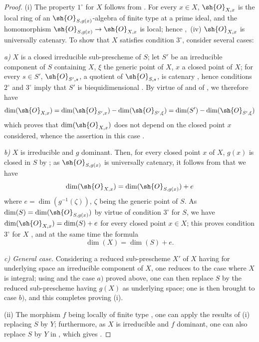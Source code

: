 \begin{proof}
(i) The property $1^\circ$ for $X$ follows from .
For every $x\in X$, $\sh{O}_{X,x}$ is the local ring of an $\sh{O}_{S,g(x)}$-algebra of finite type at a prime ideal, and the homomorphism $\sh{O}_{S,g(x)}\to\sh{O}_{X,x}$ is local; hence ,~(iv) $\sh{O}_{X,x}$ is universally catenary.
To show that $X$ satisfies condition $3^\circ$, consider several cases:

\emph{a)} $X$ is a closed irreducible sub-prescheme of $S$; let $S'$ be an irreducible component of $S$ containing $X$, $\xi$ the generic point of $X$, $x$ a closed point of $X$; for every $s\in S'$, $\sh{O}_{S',s}$, a quotient of $\sh{O}_{S,s}$, is catenary , hence conditions $2^\circ$ and $3^\circ$ imply that $S'$ is biequidimensional .
By virtue of  and of , we therefore have
\[
  \dim(\sh{O}_{X,x})=\dim(\sh{O}_{S',x})-\dim(\sh{O}_{S',\xi})=\dim(S')-\dim(\sh{O}_{S',\xi})
\]
which proves that $\dim(\sh{O}_{X,x})$ does not depend on the closed point $x$ considered, whence the assertion in this case .

\emph{b)} $X$ is irreducible and $g$ dominant.
Then, for every closed point $x$ of $X$, $g(x)$ is closed in $S$ by ; as $\sh{O}_{S,g(x)}$ is universally catenary, it follows from  that we have
\[
  \dim(\sh{O}_{X,x})=\dim(\sh{O}_{S,g(x)})+e
\]
where $e=\dim(g^{-1}(\zeta))$, $\zeta$ being the generic point of $S$.
As $\dim(S)=\dim(\sh{O}_{S,g(x)})$ by virtue of condition $3^\circ$ for $S$, we have $\dim(\sh{O}_{X,x})=\dim(S)+e$ for every closed point $x\in X$; this proves condition $3^\circ$ for $X$ , and at the same time the formula
\begin{equation}
\label{IV.10.6.1.4}
\tag{10.6.1.4}
\dim(X)=\dim(S)+e.
\end{equation}

\emph{c) General case.}
Considering a reduced sub-prescheme $X'$ of $X$ having for underlying space an irreducible component of $X$, one reduces to the case where $X$ is integral; using  and the case $a)$ proved above, one can then replace $S$ by the reduced sub-prescheme having $g(X)$ as underlying space; one is then brought to case $b)$, and this completes proving (i).

(ii) The morphism $f$ being locally of finite type , one can apply the results of (i) replacing $S$ by $Y$; furthermore, as $X$ is irreducible and $f$ dominant, one can also replace $S$ by $Y$ in , which gives .


\end{proof}
